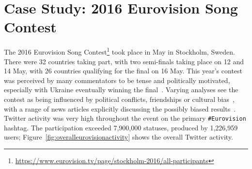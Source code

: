 \documentclass{llncs}
\begin{document}


\section{Case Study: 2016 Eurovision Song Contest}\label{eurovisioncasestudy}

The 2016 Eurovision Song
Contest\footnote{\url{https://www.eurovision.tv/page/stockholm-2016/all-participants}}
took place in May in Stockholm, Sweden. There were 32 countries taking
part, with two semi-finals taking place on 12 and 14 May, with 26
countries qualifying for the final on 16 May. This year's contest was
perceived by many commentators to be tense and politically motivated,
especially with Ukraine eventually winning the
final~\cite{telegrapheuroboycott:2016}. Varying analyses see the
contest as being influenced by political conflicts, friendships or
cultural
bias~\cite{ginsburgh+noury:2008,charron:2013,blangiardo+baio:2014,budzinski+pannicke:2016},
with a range of news articles explicitly discussing the possibly
biased results~\cite{telegrapheurobias:2016}.  Twitter activity was
very high throughout the event on the primary {\texttt{\#Eurovision}}
hashtag. The participation exceeded 7,900,000 statuses, produced by
1,226,959 users; Figure~\ref{fig:overalleurovisionactivity} shows the
overall Twitter activity.
\end{document}
